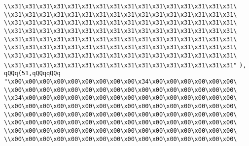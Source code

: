 \verb|\\x31\x31\x31\x31\x31\x31\x31\x31\x31\x31\x31\x31\x31\x31\x31\x31\|\newline
\verb|\\x31\x31\x31\x31\x31\x31\x31\x31\x31\x31\x31\x31\x31\x31\x31\x31\|\newline
\verb|\\x31\x31\x31\x31\x31\x31\x31\x31\x31\x31\x31\x31\x31\x31\x31\x31\|\newline
\verb|\\x31\x31\x31\x31\x31\x31\x31\x31\x31\x31\x31\x31\x31\x31\x31\x31\|\newline
\verb|\\x31\x31\x31\x31\x31\x31\x31\x31\x31\x31\x31\x31\x31\x31\x31\x31\|\newline
\verb|\\x31\x31\x31\x31\x31\x31\x31\x31\x31\x31\x31\x31\x31\x31\x31\x31\|\newline
\verb|\\x31\x31\x31\x31\x31\x31\x31\x31\x31\x31\x31\x31\x31\x31\x31\x31\|\newline
\verb|\\x31\x31\x31\x31\x31\x31\x31\x31\x31\x31\x31\x31\x31\x31\x31\x31"|\newline
\verb|),|\newline
\verb|qQQq(51,qQQqqQQq|\newline
\verb|"\x00\x00\x00\x00\x00\x00\x00\x00\x00\x34\x00\x00\x00\x00\x00\x00\|\newline
\verb|\\x00\x00\x00\x00\x00\x00\x00\x00\x00\x00\x00\x00\x00\x00\x00\x00\|\newline
\verb|\\x34\x00\x00\x00\x00\x00\x00\x00\x00\x00\x00\x00\x00\x00\x00\x00\|\newline
\verb|\\x00\x00\x00\x00\x00\x00\x00\x00\x00\x00\x00\x00\x00\x00\x00\x00\|\newline
\verb|\\x00\x00\x00\x00\x00\x00\x00\x00\x00\x00\x00\x00\x00\x00\x00\x00\|\newline
\verb|\\x00\x00\x00\x00\x00\x00\x00\x00\x00\x00\x00\x00\x00\x00\x00\x00\|\newline
\verb|\\x00\x00\x00\x00\x00\x00\x00\x00\x00\x00\x00\x00\x00\x00\x00\x00\|\newline
\verb|\\x00\x00\x00\x00\x00\x00\x00\x00\x00\x00\x00\x00\x00\x00\x00\x00\|\newline
